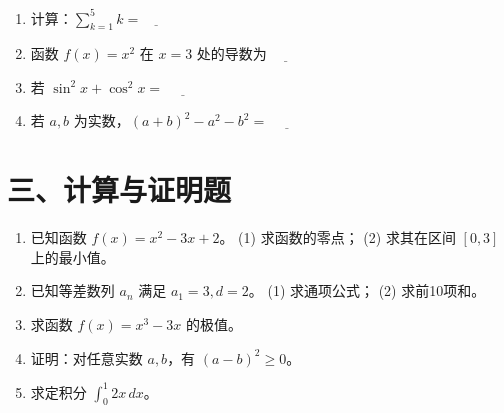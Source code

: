 \documentclass[UTF8,a4paper]{ctexart}
\begin{document}
\begin{enumerate}[leftmargin=2em,itemsep=0.8em]


\item 计算：$\sum_{k=1}^{5} k = \underline{\qquad}$




\item 函数 $f(x)=x^2$ 在 $x=3$ 处的导数为 $\underline{\qquad}$




\item 若 $\sin^2 x+\cos^2 x=$ $\underline{\qquad}$




\item 若 $a,b$ 为实数，$(a+b)^2-a^2-b^2=$ $\underline{\qquad}$



\end{enumerate}
\vspace{1em}


\section*{三、计算与证明题}


\begin{enumerate}[leftmargin=2em,itemsep=0.8em]


\item 已知函数 $f(x)=x^2-3x+2$。
(1) 求函数的零点；
(2) 求其在区间 $[0,3]$ 上的最小值。




\item 已知等差数列 $a_n$ 满足 $a_1=3,d=2$。
(1) 求通项公式；
(2) 求前10项和。




\item 求函数 $f(x)=x^3-3x$ 的极值。




\item 证明：对任意实数 $a,b$，有
$(a-b)^2 \ge 0$。




\item 求定积分 $\int_0^1 2x\,dx$。



\end{enumerate}
\vspace{1em}
\end{document}
